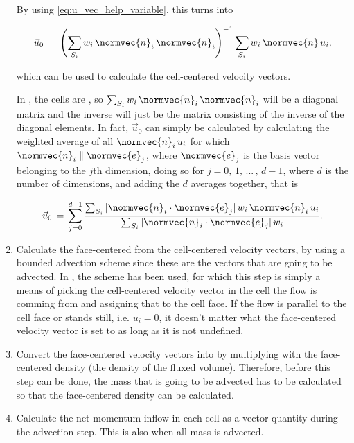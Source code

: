 \begin{enumerate}
    By using \eqref{eq:u_vec_help_variable}, this turns into
    
    \begin{equation}
    \vec{u}_0 \,=\, \left(\sum_{S_i}w_i\,\normvec{n}_i\,\normvec{n}_i\right)^{-1}\sum_{S_i}w_i\,\normvec{n}\,u_i,
    \end{equation}
    
    which can be used to calculate the cell-centered velocity vectors.
    
    In \thisprojectwork, the cells are , so $\sum_{S_i}w_i\,\normvec{n}_i\,\normvec{n}_i$ will be a diagonal matrix and the inverse will just be the matrix consisting of the inverse of the diagonal elements. In fact, $\vec{u}_0$ can simply be calculated by calculating the weighted average of all $\normvec{n}_i\,u_i$ for which $\normvec{n}_i\parallel \normvec{e}_j$, where $\normvec{e}_j$ is the basis vector belonging to the $j$th dimension, doing so for $j = 0,\, 1,\,...\,,\,d-1$, where $d$ is the number of dimensions, and adding the $d$ averages together, that is
    
    \begin{equation}
    \vec{u}_0 \,=\, \sum_{j=0}^{d-1} \frac{\sum_{S_i}|\normvec{n}_i\cdot\normvec{e}_j|\,w_i\,\normvec{n}_i\,u_i}{\sum_{S_i}|\normvec{n}_i\cdot\normvec{e}_j|\,w_i}.
    \end{equation}
    
    \item Calculate the face-centered  from the cell-centered velocity vectors, by using a bounded advection scheme since these are the vectors that are going to be advected. In \thisprojectwork, the \UPWIND scheme has been used, for which this step is simply a means of picking the cell-centered velocity vector in the cell the flow is comming from and assigning that to the cell face. If the flow is parallel to the cell face or stands still, i.e. $u_i = 0$, it doesn't matter what the face-centered velocity vector is set to as long as it is not undefined.
    
    \item Convert the face-centered velocity vectors into  by multiplying with the face-centered density (the density of the fluxed volume). Therefore, before this step can be done, the mass that is going to be advected has to be calculated so that the face-centered density can be calculated.
    
    \item Calculate the net momentum inflow in each cell as a vector quantity during the advection step. This is also when all mass is advected.
    

\end{enumerate}
